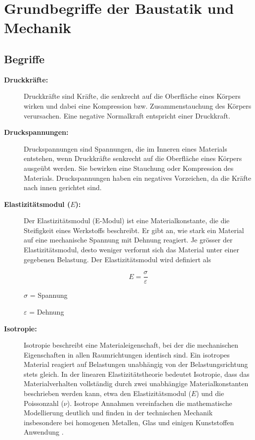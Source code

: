 %
%
%
%
\section{Grundbegriffe der Baustatik und Mechanik}
\label{elastomechanik:section:teil1}
\subsection{Begriffe}
\begin{description}	
	\item[\textbf{Druckkräfte:}] Druckkräfte sind Kräfte, die senkrecht auf die Oberfläche eines Körpers wirken und dabei eine Kompression bzw. Zusammenstauchung des Körpers verursachen. 
	Eine negative Normalkraft entspricht einer Druckkraft.
	
	\item[\textbf{Druckspannungen:}] Druckspannungen sind Spannungen, die im Inneren eines Materials entstehen, wenn Druckkräfte senkrecht auf die Oberfläche eines Körpers ausgeübt werden. 
	Sie bewirken eine Stauchung oder Kompression des Materials.
	Druckspannungen haben ein negatives Vorzeichen, da die Kräfte nach innen gerichtet sind.
	
	\item[\textbf{Elastizitätsmodul ($E$):}] Der Elastizitätsmodul (E-Modul) ist eine Materialkonstante, die die Steifigkeit eines Werkstoffs beschreibt. 
	Er gibt an, wie stark ein Material auf eine mechanische Spannung mit Dehnung reagiert. 
	Je grösser der Elastizitätsmodul, desto weniger verformt sich das Material unter einer gegebenen Belastung.
	Der Elastizitätsmodul wird definiert als

	\begin{equation}
		E=
		\frac{\sigma}{\varepsilon}
	\end{equation}

	$\sigma$ = Spannung
	
	$\varepsilon$ = Dehnung
	
	\item[\textbf{Isotropie:}] Isotropie beschreibt eine Materialeigenschaft, bei der die mechanischen Eigenschaften in allen Raumrichtungen identisch sind. 
	Ein isotropes Material reagiert auf Belastungen unabhängig von der Belastungsrichtung stets gleich.
	In der linearen Elastizitätstheorie bedeutet Isotropie, dass das Materialverhalten vollständig durch zwei unabhängige Materialkonstanten beschrieben werden kann, etwa den Elastizitätsmodul ($E$) und die Poissonzahl ($\nu$).  
	Isotrope Annahmen vereinfachen die mathematische Modellierung deutlich und finden in der technischen Mechanik insbesondere bei homogenen Metallen, Glas und einigen Kunststoffen Anwendung \cite{elastomechanik:Isotropie}.
	

\end{description}
